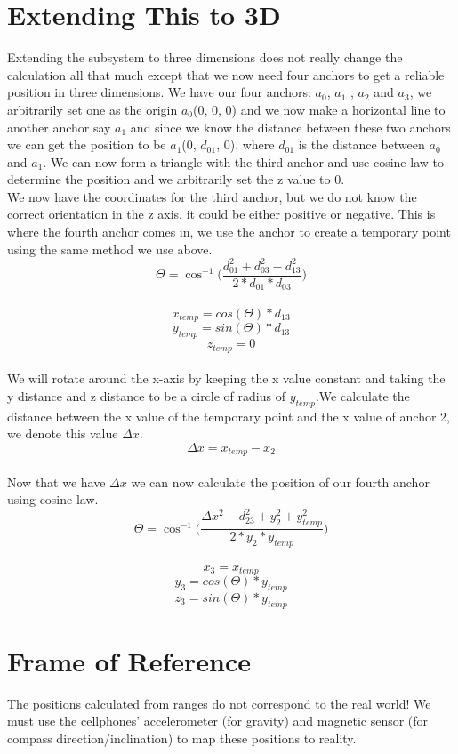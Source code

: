 \section{Extending This to 3D}
Extending the subsystem to three dimensions does not really change the calculation all that much except that we now need four anchors to get a reliable position in three dimensions. We have our four anchors: $a_{0}$, $a_{1}$ , $a_{2}$ and $a_{3}$, we arbitrarily set one as the origin $a_{0}$(0, 0, 0) and we now make a horizontal line to another anchor say $a_{1}$ and since we know the distance between these two anchors we can get the position to be $a_{1}$(0, $d_{01}$, 0), where $d_{01}$ is the distance between $a_{0}$ and $a_{1}$. We can now form a triangle with the third anchor and use cosine law to determine the position and we arbitrarily set the z value to 0.
\\
We now have the coordinates for the third anchor, but we do not know the correct orientation in the z axis, it could be either positive or negative. This is where the fourth anchor comes in, we use the anchor to create a temporary point using the same method we use above.
\\
\[ \Theta = \cos ^{ - 1}\Big(\frac{d_{01}^2 + d_{03}^2 - d_{13}^2 }{2*d_{01}*d_{03}}\Big)\]
\\
\[ x_{temp} = cos(\Theta) * d_{13} \]
\[ y_{temp} = sin(\Theta) *  d_{13} \]
\[ z_{temp} = 0 \]
\\
We will rotate around the x-axis by keeping the x value constant and taking the y distance and z distance to be a circle of radius of $y_{temp}$.We calculate the distance between the x value of the temporary point and the x value of anchor 2, we denote this value $\Delta x$.
\\
\[ \Delta x = x_{temp} - x_{2} \]
\\
Now that we have $\Delta x$ we can now calculate the position of our fourth anchor using cosine law.
\\
\[\Theta = \cos ^{ - 1}\Big(\frac {\Delta x^2 - d_{23}^2 + y_{2}^2 + y_{temp}^2}{2*y_{2}*y_{temp}}\Big)\]
\\
\[ x_{3} = x_{temp} \]
\[ y_{3} = cos(\Theta) * y_{temp} \]
\[ z_{3} = sin(\Theta) * y_{temp} \]


\section{Frame of Reference}
\label{FrameOfReference}
The positions calculated from ranges do not correspond to the real world! We must use the cellphones' accelerometer (for gravity) and magnetic sensor (for compass direction/inclination) to map these positions to reality.

